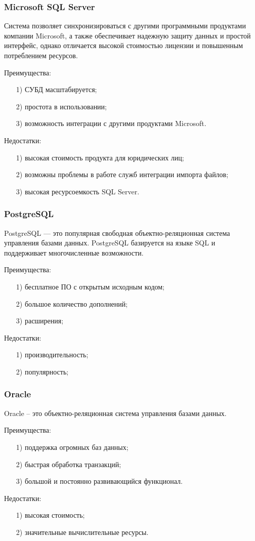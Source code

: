 \subsubsection{Microsoft SQL Server}
Система позволяет синхронизироваться с другими программными продуктами компании Microsoft, а также обеспечивает надежную защиту данных и простой интерфейс, однако отличается высокой стоимостью лицензии и повышенным потреблением ресурсов.

Преимущества:
\begin{itemize}
	\item[1)] СУБД масштабируется;
	\item[2)] простота в использовании;
	\item[3)] возможность интеграции с другими продуктами Microsoft.  
\end{itemize}
Недостатки:
\begin{itemize}
	\item[1)] высокая стоимость продукта для юридических лиц; 
	\item[2)] возможны проблемы в работе служб интеграции импорта файлов;
	\item[3)] высокая ресурсоемкость SQL Server.  
\end{itemize}
\subsubsection{PostgreSQL}
PostgreSQL — это популярная свободная объектно-реляционная система управления базами данных. PostgreSQL базируется на языке SQL и поддерживает многочисленные возможности.

Преимущества:
\begin{itemize}
	\item[1)] бесплатное ПО с открытым исходным кодом;
	\item[2)] большое количество дополнений;
	\item[3)] расширения;   
\end{itemize}
Недостатки:
\begin{itemize}
	\item[1)] производительность;
	\item[2)] популярность;  
\end{itemize}
\subsubsection{Oracle}
Oracle – это объектно-реляционная система управления базами данных.

Преимущества:
\begin{itemize}
	\item[1)] поддержка огромных баз данных;
	\item[2)] быстрая обработка транзакций;
	\item[3)] большой и постоянно развивающийся функционал.   
\end{itemize}
Недостатки:
\begin{itemize}
	\item[1)] высокая стоимость; 
	\item[2)] значительные вычислительные ресурсы. 
\end{itemize}

